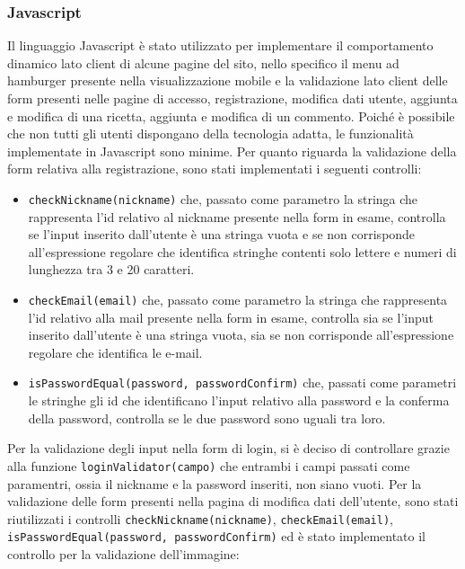 \subsubsection{Javascript}\label{subs:javascript}
Il linguaggio Javascript è stato utilizzato per implementare il comportamento dinamico lato client di alcune pagine del sito, nello specifico il menu ad hamburger presente nella visualizzazione mobile e la validazione lato client delle form presenti nelle pagine di accesso, registrazione, modifica dati utente, aggiunta e modifica di una ricetta, aggiunta e modifica di un commento.
Poiché è possibile che non tutti gli utenti dispongano della tecnologia adatta, le funzionalità implementate in Javascript sono minime. \newline
Per quanto riguarda la validazione della form relativa alla registrazione, sono stati implementati i seguenti controlli:
\begin{itemize}
	\item \texttt{checkNickname(nickname)} che, passato come parametro la stringa che rappresenta l'id relativo al nickname presente nella form in esame, controlla se l'input inserito dall'utente è una stringa vuota e se non corrisponde all'espressione regolare che identifica stringhe contenti solo lettere e numeri di lunghezza tra 3 e 20 caratteri.
	\item \texttt{checkEmail(email)} che, passato come parametro la stringa che rappresenta l'id relativo alla mail presente nella form in esame, controlla sia se l'input inserito dall'utente è una stringa vuota, sia se non corrisponde all'espressione regolare che identifica le e-mail.
	\item \texttt{isPasswordEqual(password, passwordConfirm)} che, passati come parametri le stringhe gli id che identificano l'input relativo alla password e la conferma della password, controlla se le due password sono uguali tra loro.
\end{itemize}
Per la validazione degli input nella form di login, si è deciso di controllare grazie alla funzione \texttt{loginValidator(campo)} che entrambi i campi passati come paramentri, ossia il nickname e la password inseriti, non siano vuoti. \newline
Per la validazione delle form presenti nella pagina di modifica dati dell'utente, sono stati riutilizzati i controlli \texttt{checkNickname(nickname)}, \texttt{checkEmail(email)}, \texttt{isPasswordEqual(password, passwordConfirm)} ed è stato implementato il controllo per la validazione dell'immagine:
